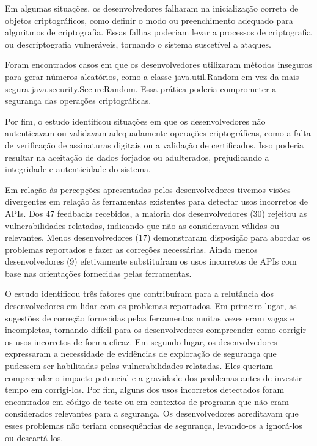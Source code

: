 Em algumas situações, os desenvolvedores falharam na inicialização correta de objetos criptográficos, como definir o modo ou preenchimento adequado para algoritmos de criptografia. Essas falhas poderiam levar a processos de criptografia ou descriptografia vulneráveis, tornando o sistema suscetível a ataques.

Foram encontrados casos em que os desenvolvedores utilizaram métodos inseguros para gerar números aleatórios, como a classe java.util.Random em vez da mais segura java.security.SecureRandom. Essa prática poderia comprometer a segurança das operações criptográficas.

Por fim, o estudo identificou situações em que os desenvolvedores não autenticavam ou validavam adequadamente operações criptográficas, como a falta de verificação de assinaturas digitais ou a validação de certificados. Isso poderia resultar na aceitação de dados forjados ou adulterados, prejudicando a integridade e autenticidade do sistema.




Em relação às percepções apresentadas pelos desenvolvedores tivemos visões divergentes em relação às ferramentas existentes para detectar usos incorretos de APIs. Dos 47 feedbacks recebidos, a maioria dos desenvolvedores (30) rejeitou as vulnerabilidades relatadas, indicando que não as consideravam válidas ou relevantes. Menos desenvolvedores (17) demonstraram disposição para abordar os problemas reportados e fazer as correções necessárias. Ainda menos desenvolvedores (9) efetivamente substituíram os usos incorretos de APIs com base nas orientações fornecidas pelas ferramentas.

O estudo identificou três fatores que contribuíram para a relutância dos desenvolvedores em lidar com os problemas reportados. Em primeiro lugar, as sugestões de correção fornecidas pelas ferramentas muitas vezes eram vagas e incompletas, tornando difícil para os desenvolvedores compreender como corrigir os usos incorretos de forma eficaz. Em segundo lugar, os desenvolvedores expressaram a necessidade de evidências de exploração de segurança que pudessem ser habilitadas pelas vulnerabilidades relatadas. Eles queriam compreender o impacto potencial e a gravidade dos problemas antes de investir tempo em corrigi-los. Por fim, alguns dos usos incorretos detectados foram encontrados em código de teste ou em contextos de programa que não eram considerados relevantes para a segurança. Os desenvolvedores acreditavam que esses problemas não teriam consequências de segurança, levando-os a ignorá-los ou descartá-los.

